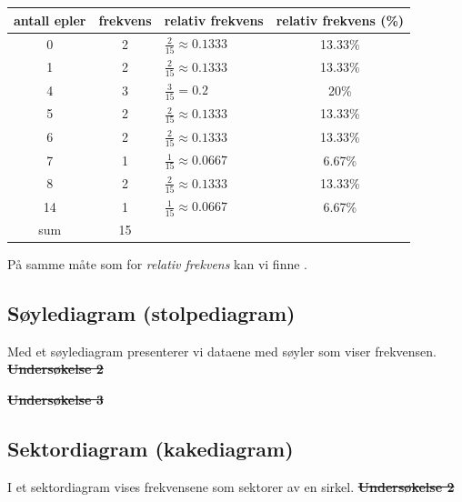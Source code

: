 {\begin{center}
\begin{tabular}{|c|c|l|c|}
		\hline
		antall epler & frekvens & relativ frekvens  & relativ frekvens (\%)\\ \hline
		0 & 2 & $ \frac{2}{15}\approx 0.1333 $ & 13.33\% \\ 
		1 & 2 & $ \frac{2}{15}\approx 0.1333 $ & 13.33\%\\
		4 & 3 & $ \frac{3}{15}=0.2 $ & 20\% \\
		5 & 2 & $ \frac{2}{15}\approx 0.1333 $ & 13.33\%\\
		6 & 2 & $ \frac{2}{15}\approx 0.1333 $ & 13.33\% \\
		7 & 1 & $ \frac{1}{15}\approx 0.0667 $ & 6.67\%\\
		8 & 2 & $ \frac{2}{15}\approx 0.1333 $ & 13.33\%\\
		14& 1 & $ \frac{1}{15}\approx 0.0667 $ & 6.67\%\\ \hline
		sum& 15 \\ \hline
	\end{tabular}
\end{center}
På samme måte som for \textit{relativ frekvens} kan vi finne .
}

\newpage
\subsection{Søylediagram (stolpediagram)}
Med et søylediagram presenterer vi dataene med søyler som viser frekvensen. \\[8pt]
\st{ \label{soylund2}
\textbf{Undersøkelse 2}
} \vsk

\st{
\textbf{Undersøkelse 3}
}
\newpage
{}
\newpage
\subsection{Sektordiagram (kakediagram)}
I et sektordiagram vises frekvensene som sektorer av en sirkel. \regv
\st{  \label{sektorund2}
\textbf{Undersøkelse 2}
} \vsk

